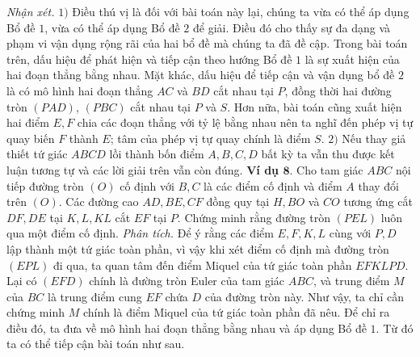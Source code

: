 \begin{multicols}{2}
\begin{figure}[H]
		\vspace*{-10pt}
	\end{figure}
	\textit{Nhận xét.} $1)$ Điều thú vị là đối với bài toán này lại, chúng ta vừa có thể áp dụng Bổ đề $1$, vừa có thể áp dụng Bổ đề $2$ để giải. Điều đó cho thấy sự đa dạng và phạm vi vận dụng rộng rãi của hai bổ đề mà chúng ta đã đề cập. Trong bài toán trên, dấu hiệu để phát hiện và tiếp cận theo hướng Bổ đề $1$  là sự xuất hiện của hai đoạn thẳng bằng nhau. Mặt khác, dấu hiệu để tiếp cận và vận dụng bổ đề $2$ là có mô hình hai đoạn thẳng $AC$ và $BD$ cắt nhau tại $P$, đồng thời hai đường tròn $(PAD)$, $(PBC)$ cắt nhau tại $P$ và $S$. Hơn nữa, bài toán cũng xuất hiện hai điểm $E,F$ chia các đoạn thẳng với tỷ lệ bằng nhau nên ta nghĩ đến phép vị tự quay biến $F$ thành $E$; tâm của phép vị tự quay chính là điểm $S$.
	\vskip 0.1cm
	$2)$ Nếu thay giả thiết tứ giác $ABCD$ lồi thành bốn điểm $A, B, C, D$ bất kỳ ta vẫn thu được kết luận tương tự và các lời giải trên vẫn còn đúng.
	\vskip 0.1cm
	\textbf{\color{hoccungpi}Ví dụ $\pmb{8.}$} Cho tam giác $ABC$ nội tiếp đường tròn $(O)$ cố định với $B,C$ là các điểm cố định và điểm $A$ thay đổi trên $(O)$. Các đường cao $AD,BE,CF$ đồng quy tại $H,BO$ và $CO$ tương ứng cắt $DF,DE$ tại $K,L,KL$ cắt $EF$ tại $P$. Chứng minh rằng đường tròn $(PEL)$ luôn qua một điểm cố định.
	\vskip 0.1cm
	\textit{Phân tích.} Để ý rằng các điểm $E,F,K,L$ cùng với $P,D$ lập thành một tứ giác toàn phần, vì vậy khi xét điểm cố định mà đường tròn $(EPL)$ đi qua, ta quan tâm đến điểm Miquel của tứ giác toàn phần $EFKLPD$. Lại có $(EFD)$ chính là đường tròn Euler của tam giác $ABC$, và trung điểm $M$ của $BC$ là trung điểm cung $EF$ chứa $D$ của đường tròn này. Như vậy, ta chỉ cần chứng minh $M$ chính là điểm Miquel của tứ giác toàn phần đã nêu. Để chỉ ra điều đó, ta đưa về mô hình hai đoạn thẳng bằng nhau và áp dụng Bổ đề $1$. Từ đó ta có thể tiếp cận bài toán như sau.
	\begin{figure}[H]
		\vspace*{-5pt}
		\centering
		\captionsetup{labelformat= empty, justification=centering}

\end{figure}
\end{multicols}
